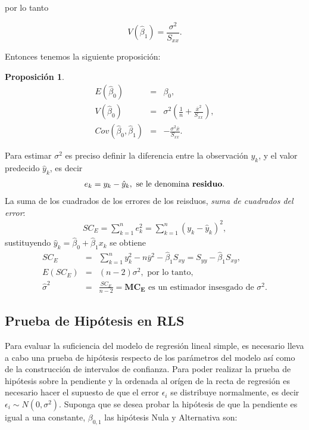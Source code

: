 \documentclass[a4paper]{report} %
\newtheorem{Prop}{Proposici\'on}[chapter]
\begin{document}
por lo tanto

\begin{equation}\label{Varianza.Beta.1.Original}
V\left(\hat{\beta}_{1}\right)=\frac{\sigma^{2}}{S_{xx}}.
\end{equation}

Entonces tenemos la siguiente proposici\'on: 
\begin{Prop}
\begin{eqnarray}
E\left(\hat{\beta}_{0}\right)&=&\beta_{0},\\
V\left(\hat{\beta}_{0}\right)&=&\sigma^{2}\left(\frac{1}{n}+\frac{\overline{x}^{2}}{S_{xx}}\right),\\
Cov\left(\hat{\beta}_{0},\hat{\beta}_{1}\right)&=&-\frac{\sigma^{2}\overline{x}}{S_{xx}}.
\end{eqnarray}
\end{Prop}
Para estimar $\sigma^{2}$ es preciso definir la diferencia entre la observaci\'on $y_{k}$, y el valor predecido $\hat{y}_{k}$, es decir
\begin{eqnarray*}
e_{k}=y_{k}-\hat{y}_{k},\textrm{ se le denomina \textbf{residuo}.}
\end{eqnarray*}
La suma de los cuadrados de los errores de los reisduos, \textit{suma de cuadrados del error}:
\begin{eqnarray}
SC_{E}=\sum_{k=1}^{n}e_{k}^{2}=\sum_{k=1}^{n}\left(y_{k}-\hat{y}_{k}\right)^{2},
\end{eqnarray}
sustituyendo $\hat{y}_{k}=\hat{\beta}_{0}+\hat{\beta}_{1}x_{k}$ se obtiene
\begin{eqnarray}
SC_{E}&=&\sum_{k=1}^{n}y_{k}^{2}-n\overline{y}^{2}-\hat{\beta}_{1}S_{xy}=S_{yy}-\hat{\beta}_{1}S_{xy},\\
E\left(SC_{E}\right)&=&\left(n-2\right)\sigma^{2},\textrm{ por lo tanto,}\\
\hat{\sigma}^{2}&=&\frac{SC_{E}}{n-2}=\mathbf{MC_{E}}\textrm{ es un estimador insesgado de }\sigma^{2}.
\end{eqnarray}

\subsection{Prueba de Hip\'otesis en RLS}

Para evaluar la suficiencia del modelo de regresi\'on lineal simple, es necesario lleva a cabo una prueba de hip\'otesis respecto de los par\'ametros del modelo as\'i como de la construcci\'on de intervalos de confianza. Para poder realizar la prueba de hip\'otesis sobre la pendiente y la ordenada al or\'igen de la recta de regresi\'on es necesario hacer el supuesto de que el error $\epsilon_{i}$ se distribuye normalmente, es decir $\epsilon_{i} \sim N\left(0,\sigma^{2}\right)$. Suponga que se desea probar la hip\'otesis de que la pendiente es igual a una constante, $\beta_{0,1}$ las hip\'otesis Nula y Alternativa son:
\end{document}
